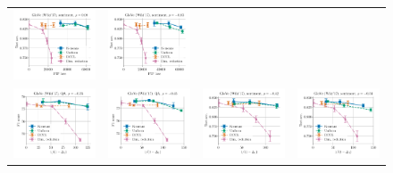 \begin{figure}
\begin{tabular}{@{\hskip -0.0in}c@{\hskip -0.0in}c@{\hskip -0.0in}c@{\hskip -0.0in}c@{\hskip -0.0in}}
		\includegraphics[width=.245\linewidth]{figures/glove-wiki400k-am_sentiment_sst_test-acc_vs_gram-large-dim-frob-error_linx_det.pdf} &
		\includegraphics[width=.245\linewidth]{figures/glove-wiki400k-am_sentiment_sst_test-acc_vs_gram-large-dim-frob-error_linx_stoc.pdf} \\
		\includegraphics[width=.245\linewidth]{figures/glove-wiki400k-am_qa_best-f1_vs_gram-large-dim-delta1-2-trans_linx_det.pdf} &
		\includegraphics[width=.245\linewidth]{figures/glove-wiki400k-am_qa_best-f1_vs_gram-large-dim-delta1-2-trans_linx_stoc.pdf} &
		\includegraphics[width=.245\linewidth]{figures/glove-wiki400k-am_sentiment_sst_test-acc_vs_gram-large-dim-delta1-2-trans_linx_det.pdf} &
		\includegraphics[width=.245\linewidth]{figures/glove-wiki400k-am_sentiment_sst_test-acc_vs_gram-large-dim-delta1-2-trans_linx_stoc.pdf} \\

\end{tabular}
\end{figure}
